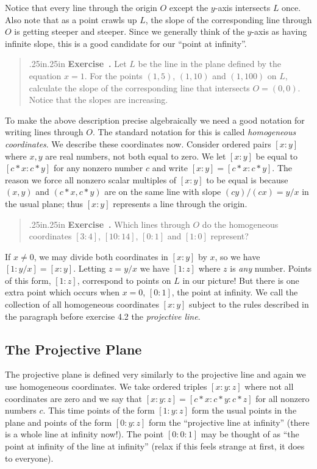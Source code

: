 \documentclass[12 pt]{article}
\newcounter{exercise}[section]
\newenvironment{exercise}{\refstepcounter{exercise}\par\bigskip \begin{quotation}{}{\leftmargin .25in\rightmargin .25in}
	\noindent \textbf{Exercise~\thesection.\theexercise }  \rmfamily}{\end{quotation}\par\bigskip}
\begin{document}
Notice that every line through the origin $O$ except the $y$-axis intersects $L$ once. Also note that as a point crawls up $L$, the slope of the corresponding line through $O$ is getting steeper and steeper. Since we generally think of the $y$-axis as having infinite slope, this is a good candidate for our ``point at infinity''.

\begin{exercise}
Let $L$ be the line in the plane defined by the equation $x=1$. For the points $(1,5)$, $(1,10)$ and $(1,100)$ on $L$, calculate the slope of the corresponding line that intersects $O=(0,0)$. Notice that the slopes are increasing.
\end{exercise}

To make the above description precise algebraically we need a good notation for writing lines through $O$. The standard notation for this is called \emph{homogeneous coordinates}. We describe these coordinates now. Consider ordered pairs $[x:y]$ where $x,y$ are real numbers, not both equal to zero. We let $[x:y]$ be equal to $[c*x:c*y]$ for any nonzero number $c$ and write $[x:y]=[c*x:c*y]$. The reason we force all nonzero scalar multiples of $[x:y]$ to be equal is because $(x,y)$ and $(c*x,c*y)$ are on the same line with slope $(cy)/(cx)=y/x$ in the usual plane; thus $[x:y]$ represents a line through the origin.

\begin{exercise}
Which lines through $O$ do the homogeneous coordinates $[3:4]$, $[10:14]$, $[0:1]$ and $[1:0]$ represent?
\end{exercise}

If $x\not=0$, we may divide both coordinates in $[x:y]$ by $x$, so we have $[1:y/x]=[x:y]$. Letting $z=y/x$ we have $[1:z]$ where $z$ is \emph{any} number. Points of this form, $[1:z]$, correspond to points on $L$ in our picture! But there is one extra point which occurs when $x=0$, $[0:1]$, the point at infinity. We call the collection of all homogeneous coordinates $[x:y]$ subject to the rules described in the paragraph before exercise 4.2 the \emph{projective line}.

\subsection{The Projective Plane}
The projective plane is defined very similarly to the projective line and again we use homogeneous coordinates. We take ordered triples $[x:y:z]$ where not all coordinates are zero and we say that $[x:y:z]=[c*x:c*y:c*z]$ for all nonzero numbers $c$. This time points of the form $[1:y:z]$ form the usual points in the plane and points of the form $[0:y:z]$ form the ``projective line at infinity'' (there is a whole line at infinity now!). The point $[0:0:1]$ may be thought of as ``the point at infinity of the line at infinity'' (relax if this feels strange at first, it does to everyone).
\end{document}
